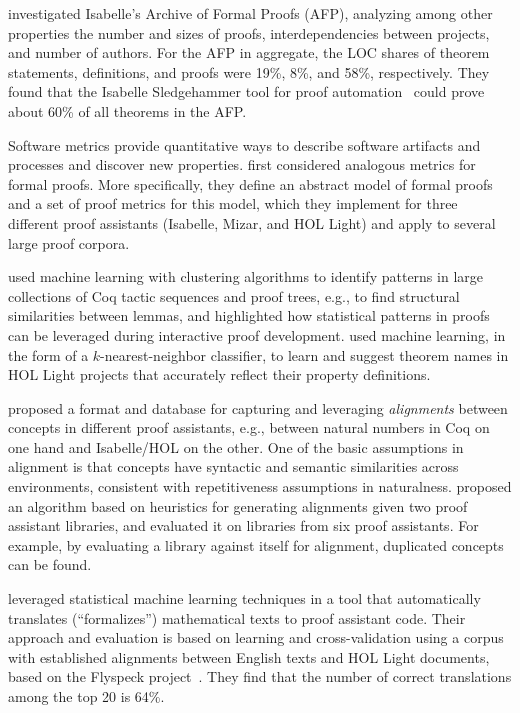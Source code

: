 \cite{Blanchette2015} investigated Isabelle's Archive of Formal Proofs (AFP), analyzing among other properties the number and sizes of proofs, interdependencies between projects, and number of authors. For the AFP in aggregate, the LOC shares of theorem statements, definitions, and proofs were 19\%, 8\%, and 58\%, respectively. They found that the Isabelle Sledgehammer tool for proof automation~\citep{Blanchette2013} could prove about 60\% of all theorems in the AFP.

Software metrics provide quantitative ways to describe software artifacts and processes and discover new properties. \cite{Aspinall2016} first considered analogous metrics for formal proofs. More specifically, they define an abstract model of formal proofs and a set of proof metrics for this model, which they implement for three different proof assistants (Isabelle, Mizar, and HOL Light) and apply to several large proof corpora.

\cite{Komendantskaya2012} used machine learning with clustering algorithms to identify patterns in large collections of Coq tactic sequences and proof trees, e.g., to find structural similarities between lemmas, and \cite{Heras2013b,Heras2014} highlighted how statistical patterns in proofs can be leveraged during interactive proof development. \cite{Aspinall2016b} used machine learning, in the form of a $k$-nearest-neighbor classifier, to learn and suggest theorem names in HOL Light projects that accurately reflect their property definitions.

\cite{Muller2017} proposed a format and database for capturing and leveraging \emph{alignments} between concepts in different proof assistants, e.g., between natural numbers in Coq on one hand and Isabelle/HOL on the other. One of the basic assumptions in alignment is that concepts have syntactic and semantic similarities across environments, consistent with repetitiveness assumptions in naturalness. \cite{gauthier2017} proposed an algorithm based on heuristics for generating alignments given two proof assistant libraries, and evaluated it on libraries from six proof assistants. For example, by evaluating a library against itself for alignment, duplicated concepts can be found.

\cite{Kaliszyk2017b} leveraged statistical machine learning techniques in a tool that automatically translates (``formalizes'') mathematical texts to proof assistant code. Their approach and evaluation is based on learning and cross-validation using a corpus with established alignments between English texts and HOL Light documents, based on the Flyspeck project~\citep{Hales2017}. They find that the number of correct translations among the top 20 is 64\%.

